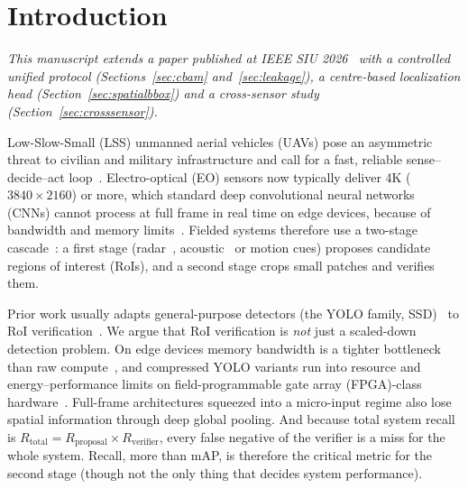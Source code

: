 \documentclass[pdflatex,sn-mathphys-num,iicol]{sn-jnl}%
\begin{document}

\maketitle

\section{Introduction}\label{sec:intro}

\textit{This manuscript extends a paper published at IEEE SIU
2026~\cite{aydin2026emadetconf} with a controlled unified protocol
(Sections~\ref{sec:cbam} and~\ref{sec:leakage}), a centre-based
localization head (Section~\ref{sec:spatialbbox}) and a
cross-sensor study (Section~\ref{sec:crosssensor}).}

 Low-Slow-Small (LSS) unmanned aerial vehicles (UAVs) pose an asymmetric
threat to civilian and military infrastructure and call for a fast,
reliable sense--decide--act loop~\cite{luo2021threat,aydin2025aads}.
Electro-optical (EO) sensors now typically deliver 4K ($3840\times2160$)
or more, which standard deep convolutional neural networks (CNNs) cannot
process at full frame in real time on edge devices, because of bandwidth
and memory limits~\cite{qasaimeh2019comparing}. Fielded systems therefore
use a two-stage cascade~\cite{kiefer2023roi}: a first stage (radar~\cite{nabati2019rrpn},
acoustic~\cite{tegler2025sound} or motion cues) proposes candidate regions of interest
(RoIs), and a second stage crops small patches and verifies them.

 Prior work usually adapts general-purpose detectors (the YOLO family,
SSD)~\cite{li2020object} to RoI
verification~\cite{achmadiah2025energy,cao2023improved}. We argue that RoI
verification is \emph{not} just a scaled-down detection problem. On edge
devices memory bandwidth is a tighter bottleneck than raw
compute~\cite{qasaimeh2019comparing}, and compressed YOLO variants run into
resource and energy--performance limits on field-programmable gate array
(FPGA)-class hardware~\cite{adiono2021low,zhang2022apply}. Full-frame
architectures squeezed into a micro-input regime also lose spatial
information through deep global pooling. And because total system recall is
$R_{\text{total}} = R_{\text{proposal}} \times R_{\text{verifier}}$, every
false negative of the verifier is a miss for the whole system. Recall, more
than mAP, is therefore the critical metric for the second stage (though not
the only thing that decides system performance).
\end{document}
